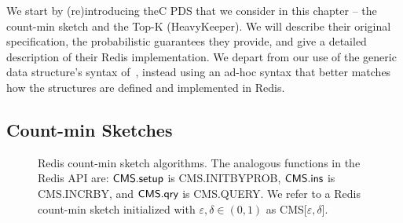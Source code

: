 We start by (re)introducing theC PDS that we consider in this chapter -- the count-min sketch and the Top-K (HeavyKeeper). We will describe their original specification, the probabilistic guarantees they provide, and give a detailed description of their Redis implementation. We depart from our use of the generic data structure's syntax of~\cite{clayton2019}, instead using an ad-hoc syntax that better matches how the structures are defined and implemented in Redis. 

\subsection{Count-min Sketches}
\label{sec:cms-intro}

\begin{figure*}[h]
    \centering
\begin{pcvstack}[boxed,space=1em]
\begin{pchstack}
    \begin{pcvstack}[space=0.5em]
       \end{pcvstack}
    \begin{pcvstack}[space=0.5em]
    \end{pcvstack}	
\end{pchstack}		
\end{pcvstack}
\caption[The Redis CMS Structure.]{Redis count-min sketch algorithms. 
The analogous functions in the Redis API are: $\textsf{CMS}.\textsf{setup}$ is \textsf{CMS.INITBYPROB}, $\textsf{CMS}.\textsf{ins}$ is \textsf{CMS.INCRBY}, and $\textsf{CMS}.\textsf{qry}$ is \textsf{CMS.QUERY}.
We refer to a Redis count-min sketch initialized with $\varepsilon, \delta \in (0,1)$ as CMS[$\varepsilon, \delta$].} 
\label{fig:redis-cms}
\end{figure*}

